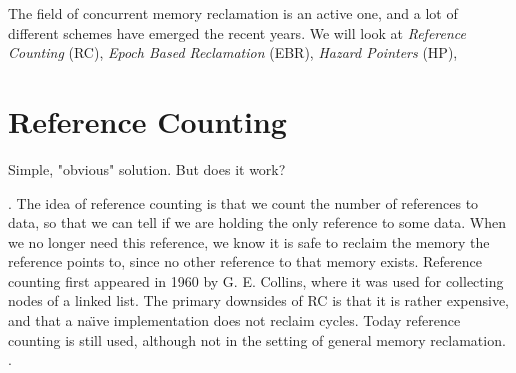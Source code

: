 \documentclass[b5paper]{report}
\begin{document}

%

The field of concurrent memory reclamation is an active one, and a lot of
different schemes have emerged the recent years. We will look at
\emph{Reference Counting} (RC),
\emph{Epoch Based Reclamation} (EBR),
\emph{Hazard Pointers} (HP),




\section{Reference Counting}
Simple, "obvious" solution. But does it work?

. The idea of reference counting is that we count the number of references
to data, so that we can tell if we are holding the only reference to some
data. When we no longer need this reference, we know it is safe to reclaim the
memory the reference points to, since no other reference to that memory
exists. Reference counting first appeared in 1960 by G. E.
Collins\cite{collins1960method}, where it was used for collecting nodes of a
linked list. The primary downsides of RC is that it is rather expensive, and
that a na\"\i{}ve implementation does not reclaim cycles. Today reference
counting is still used, although not in the setting of general memory
reclamation.  .
\end{document}
